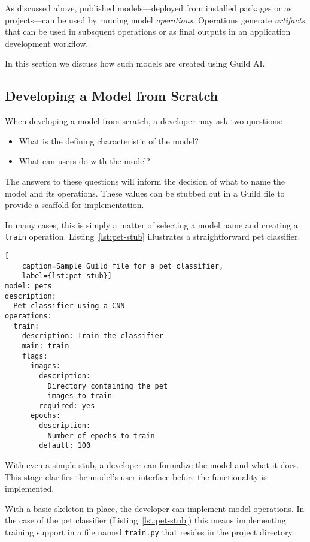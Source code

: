 \documentclass{article}
\begin{document}
As discussed above, published models---deployed from installed
packages or as projects---can be used by running model
\emph{operations}. Operations generate \emph{artifacts} that can be
used in subsquent operations or as final outputs in an application
development workflow.

In this section we discuss how such models are created using Guild AI.

\subsection{Developing a Model from Scratch}

When developing a model from scratch, a developer may ask two
questions:

\begin{itemize}
\item What is the defining characteristic of the model?
\item What can users do with the model?
\end{itemize}

The answers to these questions will inform the decision of what to
name the model and its operations. These values can be stubbed out in
a Guild file to provide a scaffold for implementation.

In many cases, this is simply a matter of selecting a model name and
creating a \verb|train| operation. Listing~\ref{lst:pet-stub}
illustrates a straightforward pet classifier.

\begin{lstlisting}[
    caption=Sample Guild file for a pet classifier,
    label={lst:pet-stub}]
model: pets
description:
  Pet classifier using a CNN
operations:
  train:
    description: Train the classifier
    main: train
    flags:
      images:
        description:
          Directory containing the pet
          images to train
        required: yes
      epochs:
        description:
          Number of epochs to train
        default: 100
\end{lstlisting}

With even a simple stub, a developer can formalize the model and what
it does. This stage clarifies the model's user interface before the
functionality is implemented.

With a basic skeleton in place, the developer can implement model
operations. In the case of the pet classifier
(Listing~\ref{lst:pet-stub}) this means implementing training support
in a file named \verb|train.py| that resides in the project directory.
\end{document}
